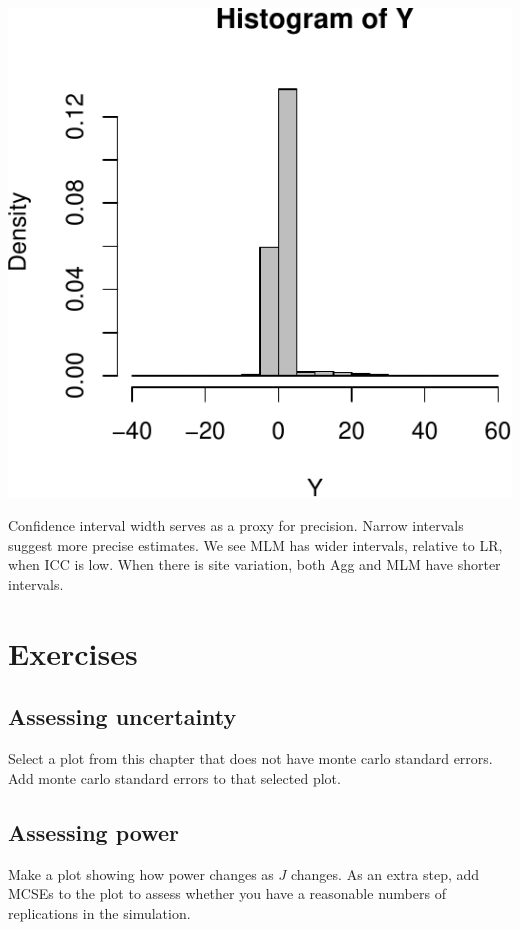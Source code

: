 \documentclass[
]{book}
\begin{document}
\begin{center}\includegraphics[width=0.75\linewidth]{Designing-Simulations-in-R_files/figure-latex/unnamed-chunk-190-1} \end{center}

Confidence interval width serves as a proxy for precision. Narrow intervals suggest more precise estimates.
We see MLM has wider intervals, relative to LR, when ICC is low. When there is site variation, both Agg and MLM have shorter intervals.

\section{Exercises}\label{exercises-9}

\subsection{Assessing uncertainty}\label{assessing-uncertainty}

Select a plot from this chapter that does not have monte carlo standard errors.
Add monte carlo standard errors to that selected plot.

\subsection{Assessing power}\label{assessing-power}

Make a plot showing how power changes as \(J\) changes.
As an extra step, add MCSEs to the plot to assess whether you have a reasonable numbers of replications in the simulation.
\end{document}
